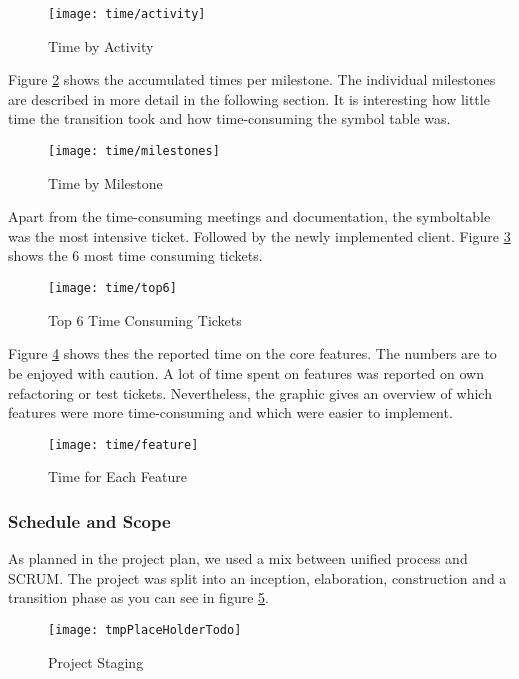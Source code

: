 \begin{figure}[H]
    \centering
    \texttt{[image: time/activity]}
    \caption{Time by Activity}
    \label{fig:timetracking_activity}
\end{figure}

Figure \ref{fig:time_milestones} shows the accumulated times per milestone.
The individual milestones are described in more detail in the following section.
It is interesting how little time the transition took and how time-consuming the symbol table was.

\begin{figure}[H]
    \centering
    \texttt{[image: time/milestones]}
    \caption{Time by Milestone}
    \label{fig:time_milestones}
\end{figure}

Apart from the time-consuming meetings and documentation, the symboltable was the most intensive ticket.
Followed by the newly implemented client.
Figure \ref{fig:time_ticket} shows the 6 most time consuming tickets.

\begin{figure}[H]
    \centering
    \texttt{[image: time/top6]}
    \caption{Top 6 Time Consuming Tickets}
    \label{fig:time_ticket}
\end{figure}

Figure \ref{fig:time_feature} shows thes the reported time on the core features.
The numbers are to be enjoyed with caution.
A lot of time spent on features was reported on own refactoring or test tickets.
Nevertheless, the graphic gives an overview of which features
were more time-consuming and which were easier to implement.

\begin{figure}[H]
    \centering
    \texttt{[image: time/feature]}
    \caption{Time for Each Feature}
    \label{fig:time_feature}
\end{figure}

\subsubsection{Schedule and Scope}
As planned in the project plan, we used a mix between unified process and SCRUM.
The project was split into an inception, elaboration, construction and a transition phase
as you can see in figure \ref{fig:project_staging}.

\begin{figure}[H]
    \centering
    \texttt{[image: tmpPlaceHolderTodo]}
    \caption{Project Staging}
    \label{fig:project_staging}
\end{figure}

